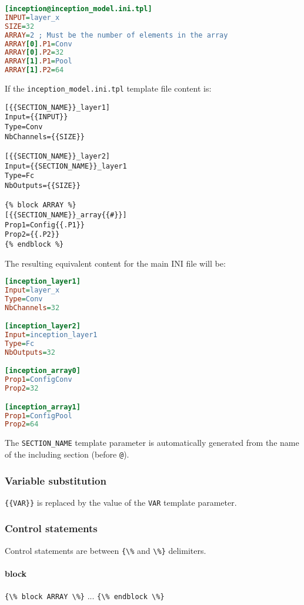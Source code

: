 \documentclass[a4paper,11pt,oneside]{article}
\begin{document}
\begin{lstlisting}[language=ini]
[inception@inception_model.ini.tpl]
INPUT=layer_x
SIZE=32
ARRAY=2 ; Must be the number of elements in the array
ARRAY[0].P1=Conv
ARRAY[0].P2=32
ARRAY[1].P1=Pool
ARRAY[1].P2=64
\end{lstlisting}

If the \lstinline!inception_model.ini.tpl! template file content is:

\begin{lstlisting}[language=tpl]
[{{SECTION_NAME}}_layer1]
Input={{INPUT}}
Type=Conv
NbChannels={{SIZE}}

[{{SECTION_NAME}}_layer2]
Input={{SECTION_NAME}}_layer1
Type=Fc
NbOutputs={{SIZE}}

{% block ARRAY %}
[{{SECTION_NAME}}_array{{#}}]
Prop1=Config{{.P1}}
Prop2={{.P2}}
{% endblock %}
\end{lstlisting}

The resulting equivalent content for the main INI file will be:

\begin{lstlisting}[language=ini]
[inception_layer1]
Input=layer_x
Type=Conv
NbChannels=32

[inception_layer2]
Input=inception_layer1
Type=Fc
NbOutputs=32

[inception_array0]
Prop1=ConfigConv
Prop2=32

[inception_array1]
Prop1=ConfigPool
Prop2=64
\end{lstlisting}

The \lstinline!SECTION_NAME! template parameter is automatically generated from
the name of the including section (before \lstinline!@!).


\subsubsection{Variable substitution}

\lstinline!{{VAR}}! is replaced by the value of the \lstinline!VAR! template
 parameter.


\subsubsection{Control statements}

Control statements are between \lstinline!{\%! and \lstinline!\%}! delimiters.

\paragraph{block}
\lstinline!{\% block ARRAY \%}! ...
\lstinline!{\% endblock \%}!
\end{document}
